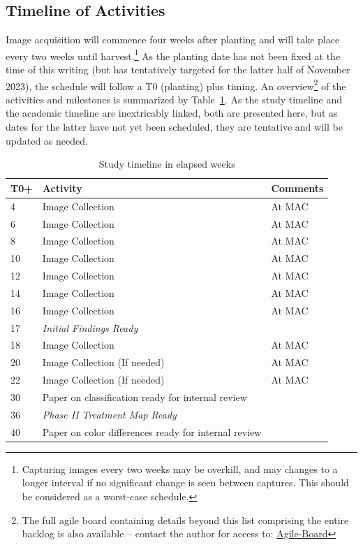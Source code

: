 \documentclass[12pt]{article}
\begin{document}
\subsection{Timeline of Activities}
Image acquisition will commence four weeks after planting and will take place every two weeks until harvest.\footnote{Capturing images every two weeks may be overkill, and may changes to a longer interval if no significant change is seen between captures. This should be considered as a worst-case schedule.} As the planting date has not been fixed at the time of this writing (but has tentatively targeted for the latter half of November 2023), the schedule will follow a T0 (planting) plus timing. An overview\footnote{The full agile board containing details beyond this list comprising the entire backlog is also available -- contact the author for access to: \href{https://evan-mcginnis.atlassian.net/jira/software/c/projects/WEED/boards/1}{Agile-Board}} of the activities and milestones is summarized by Table~\ref{tab:timeline}. As the study timeline and the academic timeline are inextricably linked, both are presented here, but as dates for the latter have not yet been scheduled, they are tentative and will be updated as needed.
\begin{table}[ht]
	\centering
    \caption{Study timeline in elapsed weeks}
    \label{tab:timeline}
    \begin{tabular}[t]{lll} 
		\textbf{T0+} & \textbf{Activity} &\textbf{Comments}\\
		\midrule
			4 & Image Collection & At MAC\\
			6 & Image Collection & At MAC\\
			8 & Image Collection & At MAC\\
			10 & Image Collection & At MAC\\
			12 & Image Collection & At MAC\\
			14 & Image Collection & At MAC\\
			16 & Image Collection & At MAC\\
			17 & \textit{Initial Findings Ready} & \\
			18 & Image Collection & At MAC\\
			20 & Image Collection (If needed) & At MAC \\
			22 & Image Collection (If needed) & At MAC \\
			30 & Paper on classification ready for internal review & \\
			36 & \textit{Phase II Treatment Map Ready} & \\
			40 & Paper on color differences ready for internal review & \\
    \end{tabular}
\end{table}
\end{document}
